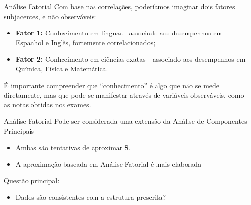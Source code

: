\documentclass[
  ignorenonframetext,
  aspectratio=169,
]{beamer}
\providecommand{\tightlist}{%
  \setlength{\itemsep}{0pt}\setlength{\parskip}{0pt}}
\begin{document}
\begin{frame}{Análise Fatorial}
\label{anuxe1lise-fatorial-2}
Com base nas correlações, poderíamos imaginar dois fatores subjacentes,
e não observáveis:

\begin{itemize}
\tightlist
\item
  \textbf{Fator 1:} Conhecimento em línguas - associado aos desempenhos
  em Espanhol e Inglês, fortemente correlacionados;
\end{itemize}

\pause

\begin{itemize}
\tightlist
\item
  \textbf{Fator 2:} Conhecimento em ciências exatas - associado aos
  desempenhos em Química, Física e Matemática.
\end{itemize}

\pause

É importante compreender que ``conhecimento'' é algo que não se mede
diretamente, mas que pode se manifestar através de variáveis
observáveis, como as notas obtidas nos exames.
\end{frame}

\begin{frame}{Análise Fatorial}
\label{anuxe1lise-fatorial-3}
Pode ser considerada uma extensão da Análise de Componentes Principais

\pause

\begin{itemize}
\tightlist
\item
  Ambas são tentativas de aproximar \(\boldsymbol{S}\).
\end{itemize}

\pause

\begin{itemize}
\tightlist
\item
  A aproximação baseada em Análise Fatorial é mais elaborada
\end{itemize}

\pause

Questão principal:

\begin{itemize}
\tightlist
\item
  Dados são consistentes com a estrutura prescrita?
\end{itemize}
\end{frame}
\end{document}
